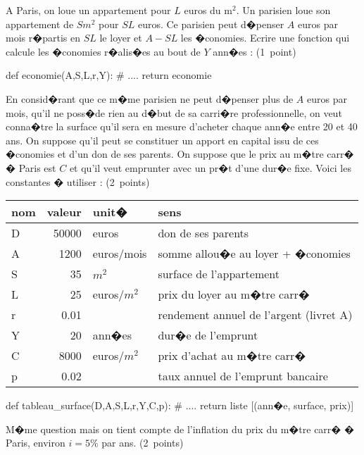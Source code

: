 \begin{xexercice}
\exequest A Paris, on loue un appartement pour $L$ euros du m$^2$. Un parisien loue son appartement de $S m^2$ pour $SL$ euros. Ce parisien peut d�penser $A$ euros par mois r�partis en $SL$ le loyer et $A-SL$ les �conomies. Ecrire une fonction qui calcule les �conomies r�alis�es au bout de $Y$ ann�es : (1~point)

\begin{verbatimx}
def economie(A,S,L,r,Y):
    # ....
    return economie
\end{verbatimx}
 

\exequest En consid�rant que ce m�me parisien ne peut d�penser plus de $A$ euros par mois, qu'il ne poss�de rien au d�but de sa carri�re professionnelle, on veut conna�tre la surface qu'il sera en mesure d'acheter chaque ann�e entre 20 et 40 ans. On suppose qu'il peut se constituer un apport en capital issu de ces �conomies et d'un don de ses parents. On suppose que le prix au m�tre carr� � Paris est $C$ et qu'il veut emprunter avec un pr�t d'une dur�e fixe. Voici les constantes � utiliser : (2~points)

\begin{center}\begin{small}\begin{tabular}{l|r|l|l} 
nom & valeur & unit� & sens \\ \hline
D & 50000 & euros & don de ses parents \\
A & 1200 & euros/mois & somme allou�e au loyer + �conomies \\
S & 35 & $m^2$ &  surface de l'appartement \\
L & 25 & euros/$m^2$ & prix du loyer au m�tre carr� \\
r & 0.01 & & rendement annuel de l'argent (livret A) \\
Y & 20 &  ann�es & dur�e de l'emprunt \\
C & 8000 & euros/$m^2$ & prix d'achat au m�tre carr� \\
p & 0.02 & & taux annuel de l'emprunt bancaire  
\end{tabular}\end{small}\end{center}

\begin{verbatimx}
def tableau_surface(D,A,S,L,r,Y,C,p):
    # ....
    return liste [(ann�e, surface, prix)]
\end{verbatimx}

\exequest M�me question mais on tient compte de l'inflation du prix du m�tre carr� � Paris, environ $i=5\%$ par ans. (2~points)


\end{xexercice}
